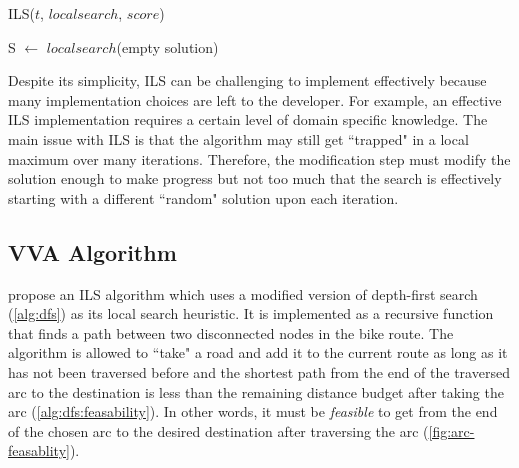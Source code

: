 \documentclass[honors]{union-cs-thesis}
\newcommand{\td}{\todo[inline]}
\begin{document}
%
%
\begin{algorithm}
\caption{ILS($t$, $localsearch$, $score$)\label{alg:ils-framework}}
S $\gets$ $localsearch$(empty solution)\;
\end{algorithm}

Despite its simplicity, ILS can be challenging to implement effectively because many implementation choices are left to the developer. For example, an effective ILS implementation requires a certain level of domain specific knowledge. The main issue with ILS is that the algorithm may still get ``trapped" in a local maximum over many iterations. Therefore, the modification step must modify the solution enough to make progress but not too much that the search is effectively starting with a different ``random" solution upon each iteration. 



\subsection{VVA Algorithm}
\citeauthor{verbeeck2014extension} propose an ILS algorithm which uses a modified version of depth-first search (\cref{alg:dfs}) as its local search heuristic. It is implemented as a recursive function that finds a path between two disconnected nodes in the bike route. The algorithm is allowed to ``take" a road and add it to the current route as long as it has not been traversed before and the shortest path from the end of the traversed arc to the destination is less than the remaining distance budget after taking the arc (\cref{alg:dfs:feasability}). In other words, it must be \emph{feasible} to get from the end of the chosen arc to the desired destination after traversing the arc (\cref{fig:arc-feasablity}).
\end{document}
